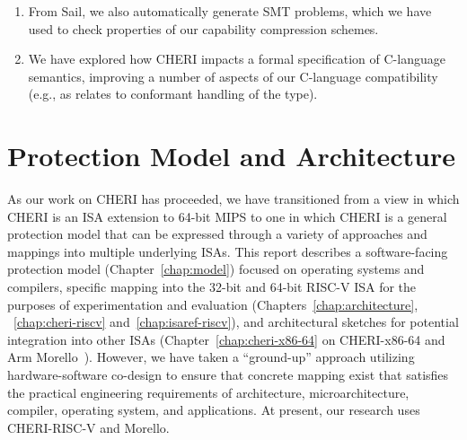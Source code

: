 \begin{enumerate}

\item From Sail, we also automatically generate SMT problems, which we
  have used to check properties of our capability compression
  schemes. 


\item We have explored how CHERI impacts a formal specification of C-language
  semantics, improving a number of aspects of our C-language compatibility
  (e.g., as relates to conformant handling of the  type).
\end{enumerate}


\section{Protection Model and Architecture}

As our work on CHERI has proceeded, we have transitioned from a view in which
CHERI is an ISA extension to 64-bit MIPS to one in which CHERI is a general
protection model that can be expressed through a variety of approaches
and mappings into multiple underlying ISAs.
This report describes a software-facing protection model
(Chapter~\ref{chap:model}) focused on operating systems and compilers,
specific mapping into the 32-bit and 64-bit RISC-V ISA for the purposes of experimentation
and evaluation (Chapters~\ref{chap:architecture}, ~\ref{chap:cheri-riscv}
and~\ref{chap:isaref-riscv}), and architectural sketches for potential integration
into other ISAs (Chapter~\ref{chap:cheri-x86-64} on CHERI-x86-64 and Arm
Morello~\cite{arm-morello}).
However, we have taken a ``ground-up'' approach utilizing hardware-software
co-design to ensure that concrete mapping exist that
satisfies the practical engineering requirements of architecture,
microarchitecture, compiler, operating system, and applications.
At present, our research uses CHERI-RISC-V and Morello.

